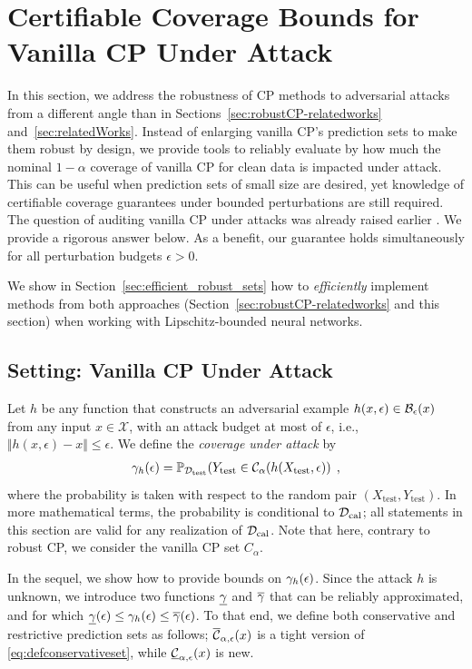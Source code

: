 \section{Certifiable Coverage Bounds for Vanilla CP Under Attack}
\label{sec:vanillacoverage}

In this section, we address the robustness of CP methods to adversarial attacks from a different angle than in Sections~\ref{sec:robustCP-relatedworks} and~\ref{sec:relatedWorks}. Instead of enlarging vanilla CP's prediction sets to make them robust by design, we provide tools to reliably evaluate by how much the nominal $1-\alpha$ coverage of vanilla CP for clean data is impacted under attack. This can be useful when prediction sets of small size are desired, yet knowledge of certifiable coverage guarantees under bounded perturbations are still required. 
The question of auditing vanilla CP under attacks was already raised earlier \cite{rscp, cas}. We provide a rigorous answer below. As a benefit, our guarantee holds simultaneously for all perturbation budgets $\epsilon>0$.

We show in Section~\ref{sec:efficient_robust_sets} how to \emph{efficiently} implement methods from both approaches (Section~\ref{sec:robustCP-relatedworks} and this section) when working with Lipschitz-bounded neural networks.


\subsection{Setting: Vanilla CP Under Attack}

Let $h$ be any function that constructs an adversarial example $h(x,\epsilon) \in \mathcal{B}_\epsilon(x)$ from any input $x \in \mathcal{X}$, with an attack budget at most of $\epsilon$, i.e., $\Vert h(x,\epsilon) - x \Vert \leq \epsilon$. We define the \emph{coverage under attack} by
\begin{align}
    \gamma_h(\epsilon)=\mathbb{P}_{\mathcal{D}_\mathrm{test}}\!\left(Y_\mathrm{test} \in \mathcal{C}_{\alpha}(h(X_\mathrm{test},\epsilon)\right)\;,
\end{align}
where the probability is taken with respect to the random pair $(X_\mathrm{test},Y_\mathrm{test})$. In more mathematical terms, the probability is conditional to $\mathcal{D}_\mathrm{cal}$; all statements in this section are valid for any realization of $\mathcal{D}_\mathrm{cal}$.
Note that here, contrary to robust CP, we consider the vanilla CP set $C_\alpha$.

In the sequel, we show how to provide bounds on $\gamma_h(\epsilon)$. Since the attack $h$ is unknown, we introduce two functions $\underline{\gamma}$ and $\overline{\gamma}$ that can be reliably approximated, and for which $\underline{\gamma}(\epsilon) \leq \gamma_h(\epsilon) \leq \overline{\gamma}(\epsilon)$. To that end, we define both conservative and restrictive prediction sets as follows; $\overline{\mathcal{C}}_{\alpha, \epsilon}(x)$ is a tight version of \eqref{eq:defconservativeset}, while $\underline{\mathcal{C}}_{\alpha, \epsilon}(x)$ is new.

